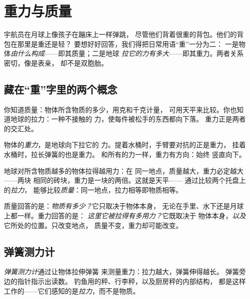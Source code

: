 \chapter{重力与质量}\label{ch:g4:weight-and-mass}

宇航员在月球上像孩子在蹦床上一样弹跳，
尽管他们背着很重的背包。他们的背包在那里是重还是轻？
要想好好回答，我们得把日常用语“重”一分为二：
一是物体\emph{由什么构成}——即其质量；二是地球
\emph{拉它的力有多大}——即其重力。两者关系密切，像是表亲，
却不是双胞胎。

\section{藏在“重”字里的两个概念}

你知道质量：物体所含物质的多少，用克和千克计量，
可用天平来比较。你也知道地球的拉力：一种不接触的
力，使每件被松手的东西都向下落。
重力正是两者的交汇处。

\begin{definition}[重力]\label{def:g4:weight-and-mass:weight}
物体的\emph{重力}，是地球向下拉它的
力。提着水桶时，手臂要对抗的正是重力，
挂着水桶时，拉长弹簧的也是重力。
和所有的力一样，重力有方向：始终
竖直向下。
\end{definition}

\begin{proposition}\label{prop:g4:weight-and-mass:morestuff}
地球对所含物质越多的物体拉得越用力：在
同一地点，质量越大，重力必定越大——两块
相同的砖块，重力是一块的两倍。这就是天平——
通过比较两个托盘上的\emph{拉力}，
能够比较\emph{质量}：同一地点，拉力相等即物质相等。
\end{proposition}

\begin{example}[表亲而非双胞胎]\label{ex:g4:weight-and-mass:cousins}
质量回答的是：\emph{物质有多少？}它只取决于物体本身，
无论在手里、水下还是月球上都一样。重力回答的是：
\emph{这里它被拉得有多用力？}它既取决于
物体本身，\emph{以及}它所处的位置。只改变地点，
质量不变，重力却可能改变。
\end{example}

\section{弹簧测力计}

\begin{definition}[弹簧测力计]\label{def:g4:weight-and-mass:springscale}
\emph{弹簧测力计}通过让物体拉伸弹簧
来测量重力：拉力越大，弹簧伸得越长。
弹簧旁边的指针指示出读数。
钓鱼用的秤、行李秤，以及厨房秤的内部结构，
都是这样工作的——它们感知的是\emph{拉力}，而不是物质。
\end{definition}

